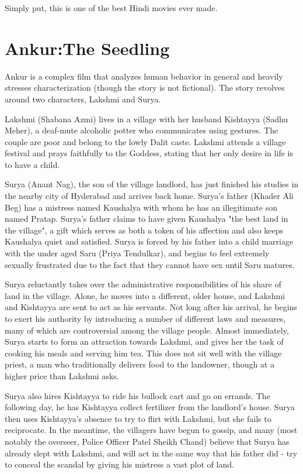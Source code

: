 \documentclass{article}
\begin{document}
Simply put, this is one of the best Hindi movies ever made. 


\section{Ankur:The Seedling}
Ankur is a complex film that analyzes human behavior in general and heavily stresses characterization (though the story is not fictional). The story revolves around two characters, Lakshmi and Surya.

Lakshmi (Shabana Azmi) lives in a village with her husband Kishtayya (Sadhu Meher), a deaf-mute alcoholic potter who communicates using gestures. The couple are poor and belong to the lowly Dalit caste. Lakshmi attends a village festival and prays faithfully to the Goddess, stating that her only desire in life is to have a child.

Surya (Anant Nag), the son of the village landlord, has just finished his studies in the nearby city of Hyderabad and arrives back home. Surya's father (Khader Ali Beg) has a mistress named Kaushalya with whom he has an illegitimate son named Pratap. Surya's father claims to have given Kaushalya "the best land in the village", a gift which serves as both a token of his affection and also keeps Kaushalya quiet and satisfied. Surya is forced by his father into a child marriage with the under aged Saru (Priya Tendulkar), and begins to feel extremely sexually frustrated due to the fact that they cannot have sex until Saru matures.

Surya reluctantly takes over the administrative responsibilities of his share of land in the village. Alone, he moves into a different, older house, and Lakshmi and Kishtayya are sent to act as his servants. Not long after his arrival, he begins to exert his authority by introducing a number of different laws and measures, many of which are controversial among the village people. Almost immediately, Surya starts to form an attraction towards Lakshmi, and gives her the task of cooking his meals and serving him tea. This does not sit well with the village priest, a man who traditionally delivers food to the landowner, though at a higher price than Lakshmi asks.

Surya also hires Kishtayya to ride his bullock cart and go on errands. The following day, he has Kishtayya collect fertilizer from the landlord's house. Surya then uses Kishtayya's absence to try to flirt with Lakshmi, but she fails to reciprocate. In the meantime, the villagers have begun to gossip, and many (most notably the overseer, Police Officer Patel Sheikh Chand) believe that Surya has already slept with Lakshmi, and will act in the same way that his father did - try to conceal the scandal by giving his mistress a vast plot of land.
\end{document}
